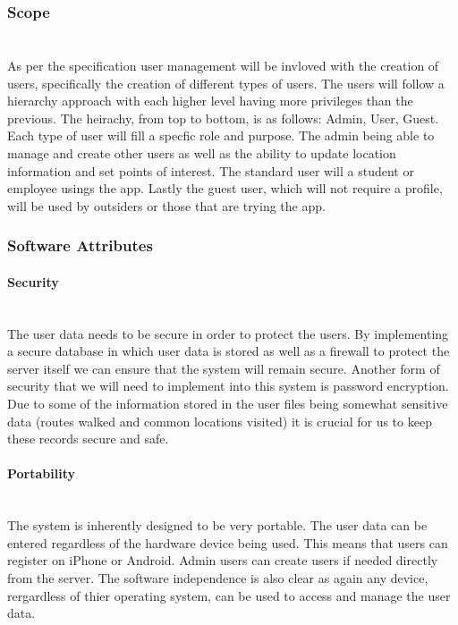 \subsubsection{Scope}
\paragraph{}
\mbox{}\\
As per the specification user management will be invloved with the creation of users, specifically the creation of different types of users. The users will follow a hierarchy approach with each higher level having more privileges than the previous. The heirachy, from top to bottom, is as follows: Admin, User, Guest. Each type of user will fill a specfic role and purpose. The admin being able to manage and create other users as well as the ability to update location information and set points of interest. The standard user will a student or employee usings the app. Lastly the guest user, which will not require a profile, will be used by outsiders or those that are trying the app.

\subsubsection{Software Attributes}
\paragraph{Security}
\mbox{}\\
The user data needs to be secure in order to protect the users. By implementing a secure database in which user data is stored as well as a firewall to protect the server itself we can ensure that the system will remain secure. Another form of security that we will need to implement into this system is password encryption. Due to some of the information stored in the user files being somewhat sensitive data (routes walked and common locations visited) it is crucial for us to keep these records secure and safe.

\paragraph{Portability}
\mbox{}\\
The system is inherently designed to be very portable. The user data can be entered regardless of the hardware device being used. This means that users can register on iPhone or Android. Admin users can create users if needed directly from the server. The software independence is also clear as again any device,  rergardless of thier operating system, can be used to access and manage the user data. 

